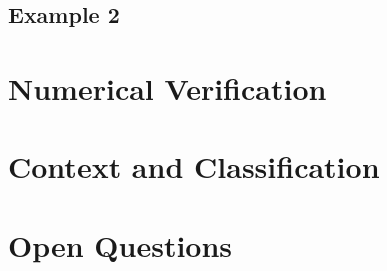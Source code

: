 \documentclass[11pt,a4paper]{article}
\begin{document}
\subsection{Example 2}

\section{Numerical Verification}
%

\section{Context and Classification}

\section{Open Questions}

\end{document}
